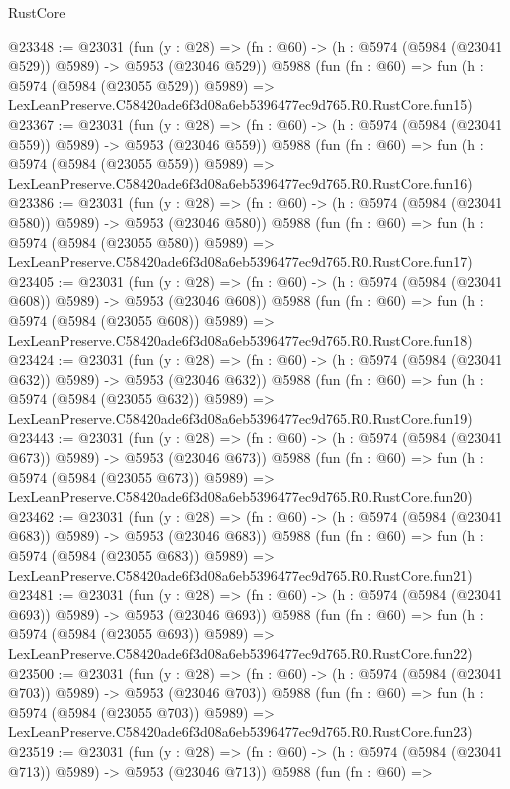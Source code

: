 \begin{lexlean}{RustCore}
\begin{coremodule}
@23348 := @23031
    (fun (y : @28) => (fn : @60) -> (h : @5974 (@5984 (@23041 @529)) @5989) -> @5953 (@23046 @529))
    @5988
    (fun (fn : @60) =>
    fun (h : @5974 (@5984 (@23055 @529)) @5989) =>
    LexLeanPreserve.C58420ade6f3d08a6eb5396477ec9d765.R0.RustCore.fun15)
@23367 := @23031
    (fun (y : @28) => (fn : @60) -> (h : @5974 (@5984 (@23041 @559)) @5989) -> @5953 (@23046 @559))
    @5988
    (fun (fn : @60) =>
    fun (h : @5974 (@5984 (@23055 @559)) @5989) =>
    LexLeanPreserve.C58420ade6f3d08a6eb5396477ec9d765.R0.RustCore.fun16)
@23386 := @23031
    (fun (y : @28) => (fn : @60) -> (h : @5974 (@5984 (@23041 @580)) @5989) -> @5953 (@23046 @580))
    @5988
    (fun (fn : @60) =>
    fun (h : @5974 (@5984 (@23055 @580)) @5989) =>
    LexLeanPreserve.C58420ade6f3d08a6eb5396477ec9d765.R0.RustCore.fun17)
@23405 := @23031
    (fun (y : @28) => (fn : @60) -> (h : @5974 (@5984 (@23041 @608)) @5989) -> @5953 (@23046 @608))
    @5988
    (fun (fn : @60) =>
    fun (h : @5974 (@5984 (@23055 @608)) @5989) =>
    LexLeanPreserve.C58420ade6f3d08a6eb5396477ec9d765.R0.RustCore.fun18)
@23424 := @23031
    (fun (y : @28) => (fn : @60) -> (h : @5974 (@5984 (@23041 @632)) @5989) -> @5953 (@23046 @632))
    @5988
    (fun (fn : @60) =>
    fun (h : @5974 (@5984 (@23055 @632)) @5989) =>
    LexLeanPreserve.C58420ade6f3d08a6eb5396477ec9d765.R0.RustCore.fun19)
@23443 := @23031
    (fun (y : @28) => (fn : @60) -> (h : @5974 (@5984 (@23041 @673)) @5989) -> @5953 (@23046 @673))
    @5988
    (fun (fn : @60) =>
    fun (h : @5974 (@5984 (@23055 @673)) @5989) =>
    LexLeanPreserve.C58420ade6f3d08a6eb5396477ec9d765.R0.RustCore.fun20)
@23462 := @23031
    (fun (y : @28) => (fn : @60) -> (h : @5974 (@5984 (@23041 @683)) @5989) -> @5953 (@23046 @683))
    @5988
    (fun (fn : @60) =>
    fun (h : @5974 (@5984 (@23055 @683)) @5989) =>
    LexLeanPreserve.C58420ade6f3d08a6eb5396477ec9d765.R0.RustCore.fun21)
@23481 := @23031
    (fun (y : @28) => (fn : @60) -> (h : @5974 (@5984 (@23041 @693)) @5989) -> @5953 (@23046 @693))
    @5988
    (fun (fn : @60) =>
    fun (h : @5974 (@5984 (@23055 @693)) @5989) =>
    LexLeanPreserve.C58420ade6f3d08a6eb5396477ec9d765.R0.RustCore.fun22)
@23500 := @23031
    (fun (y : @28) => (fn : @60) -> (h : @5974 (@5984 (@23041 @703)) @5989) -> @5953 (@23046 @703))
    @5988
    (fun (fn : @60) =>
    fun (h : @5974 (@5984 (@23055 @703)) @5989) =>
    LexLeanPreserve.C58420ade6f3d08a6eb5396477ec9d765.R0.RustCore.fun23)
@23519 := @23031
    (fun (y : @28) => (fn : @60) -> (h : @5974 (@5984 (@23041 @713)) @5989) -> @5953 (@23046 @713))
    @5988
    (fun (fn : @60) =>

\end{coremodule}
\end{lexlean}
